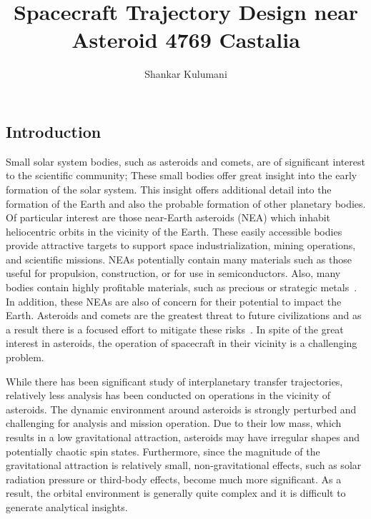 \documentclass[11pt,reqno]{amsart} %
\title{\vspace{-1.0cm}Spacecraft Trajectory Design near Asteroid 4769 Castalia}
\author{Shankar Kulumani}
\date{} %
\begin{document}
\maketitle
\begin{multicols}{2}
\section{Introduction}
Small solar system bodies, such as asteroids and comets, are of significant interest to the scientific community; These small bodies offer great insight into the early formation of the solar system.
This insight offers additional detail into the formation of the Earth and also the probable formation of other planetary bodies.
Of particular interest are those near-Earth asteroids (NEA) which inhabit heliocentric orbits in the vicinity of the Earth.
These easily accessible bodies provide attractive targets to support space industrialization, mining operations, and scientific missions.
NEAs potentially contain many materials such as those useful for propulsion, construction, or for use in semiconductors.
Also, many bodies contain highly profitable materials, such as precious or strategic metals~\cite{ross2001}.
In addition, these NEAs are also of concern for their potential to impact the Earth.
Asteroids and comets are the greatest threat to future civilizations and as a result there is a focused effort to mitigate these risks~\cite{wie2008}.
In spite of the great interest in asteroids, the operation of spacecraft in their vicinity is a challenging problem.

While there has been significant study of interplanetary transfer trajectories, relatively less analysis has been conducted on operations in the vicinity of asteroids.
The dynamic environment around asteroids is strongly perturbed and challenging for analysis and mission operation.
Due to their low mass, which results in a low gravitational attraction, asteroids may have irregular shapes and potentially chaotic spin states.
Furthermore, since the magnitude of the gravitational attraction is relatively small, non-gravitational effects, such as solar radiation pressure or third-body effects, become much more significant.
As a result, the orbital environment is generally quite complex and it is difficult to generate analytical insights.


\end{multicols}
\end{document}
